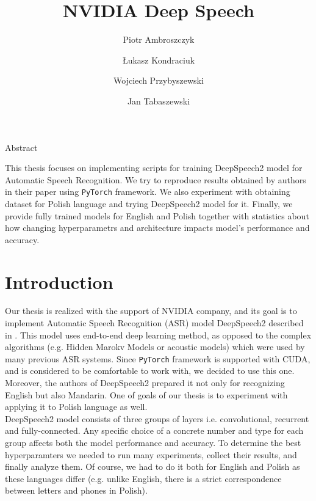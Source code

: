 \documentclass[11pt,a4paper]{article}
\title{NVIDIA Deep Speech}
\author{Piotr Ambroszczyk
\and Łukasz Kondraciuk
\and Wojciech Przybyszewski
\and Jan Tabaszewski}
\date{}
\begin{document}
\begin{titlingpage}
\maketitle
\end{titlingpage}

\begin{center}
Abstract
\end{center}
This thesis focuses on implementing scripts for training DeepSpeech2 model for Automatic Speech Recognition. We try to reproduce results obtained by authors in their paper using \texttt{PyTorch} framework. We also experiment with obtaining dataset for Polish language and trying DeepSpeech2 model for it. Finally, we provide fully trained models for English and Polish together with statistics about how changing hyperparametrs and architecture impacts model's performance and accuracy.
\newpage

\tableofcontents
\newpage

\section{Introduction}

Our thesis is realized with the support of NVIDIA company, and its goal is to implement Automatic Speech Recognition (ASR) model DeepSpeech2 described in \cite{DS2}. This model uses end-to-end deep learning method, as opposed to the complex algorithms (e.g. Hidden Marokv Models or acoustic models) which were used by many previous ASR systems. Since \texttt{PyTorch} framework is supported with CUDA, and is considered to be comfortable to work with, we decided to use this one. Moreover, the authors of DeepSpeech2 prepared it not only for recognizing English but also Mandarin. One of goals of our thesis is to experiment with applying it to Polish language as well.\\

DeepSpeech2 model consists of three groups of layers i.e. convolutional, recurrent and fully-connected. Any specific choice of a concrete number and type for each group affects both the model performance and accuracy. To determine the best hyperparamters  we needed to run many experiments, collect their results, and finally analyze them. Of course, we had to do it both for English and Polish as these languages differ (e.g. unlike English, there is a strict correspondence between letters and phones in Polish).\\
\end{document}

